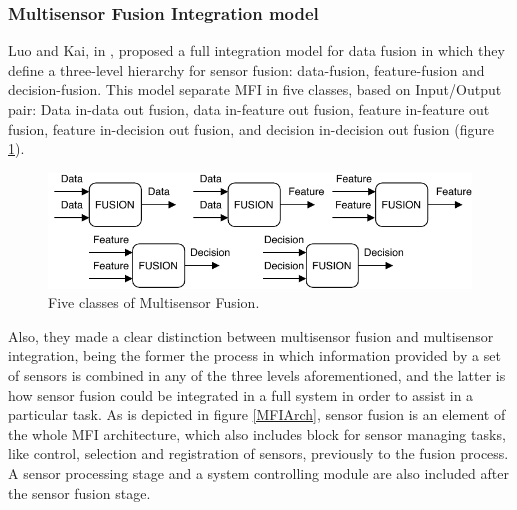 \subsubsection{Multisensor Fusion Integration model}

Luo and Kai, in \cite{Luo1989, Luo1990}, proposed a full integration model for data fusion in which they define a three-level hierarchy for sensor fusion: data-fusion, feature-fusion and decision-fusion. This model separate MFI in five classes, based on Input/Output pair: Data in-data out fusion, data in-feature out fusion, feature in-feature out fusion, feature in-decision out fusion, and decision in-decision out fusion \cite{Luo2011} (figure \ref{fusionClasses}).

\begin{figure}[ht!]
\centering
\includegraphics[scale=1]{fig/2/mfi.pdf}
\caption{Five classes of Multisensor Fusion.}
\label{fusionClasses}
\end{figure}


Also, they made a clear distinction between multisensor fusion and multisensor integration, being the former the process in which information provided by a set of sensors is combined in any of the three levels aforementioned, and the latter is how sensor fusion could be integrated in a full system in order to assist in a particular task. As is depicted in figure \ref{MFIArch}, sensor fusion is an element of the whole MFI architecture, which also includes block for sensor managing tasks, like control, selection and registration of sensors, previously to the fusion process. A sensor processing stage and a system controlling module are also included after the sensor fusion stage.

